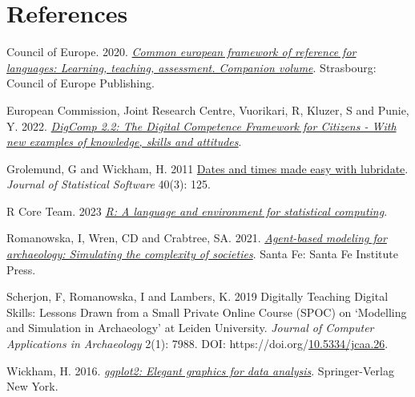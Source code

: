 \documentclass[
]{article}
\newlength{\cslhangindent}
\newlength{\cslentryspacingunit} %
\newenvironment{CSLReferences}[2] %
 {%
  \setlength{\parindent}{0pt}
  \ifodd #1
  \let\oldpar\par
  \def\par{\hangindent=\cslhangindent\oldpar}
  \fi
  \setlength{\parskip}{#2\cslentryspacingunit}
 }%
 {}
\begin{document}
\hypertarget{references}{%
\section*{References}\label{references}}

\hypertarget{refs}{}
\begin{CSLReferences}{1}{0}
\leavevmode{}%
Council of Europe. 2020. \emph{\href{http://www.coe.int/lang-cefr}{Common european framework of reference for languages: Learning, teaching, assessment. Companion volume}}. Strasbourg: Council of Europe Publishing.

\leavevmode{}%
European Commission, Joint Research Centre, Vuorikari, R, Kluzer, S and Punie, Y. 2022. \emph{\href{https://data.europa.eu/doi/10.2760/115376}{DigComp 2.2: The Digital Competence Framework for Citizens - With new examples of knowledge, skills and attitudes}}.

\leavevmode{}%
Grolemund, G and Wickham, H. 2011 \href{https://www.jstatsoft.org/v40/i03/}{Dates and times made easy with lubridate}. \emph{Journal of Statistical Software} 40(3): 125.

\leavevmode{}%
R Core Team. 2023 \emph{\href{https://www.R-project.org/}{R: A language and environment for statistical computing}}.

\leavevmode{}%
Romanowska, I, Wren, CD and Crabtree, SA. 2021. \emph{\href{https://www.sfipress.org/books/agent-based-modeling-archaeology}{Agent-based modeling for archaeology: Simulating the complexity of societies}}. Santa Fe: Santa Fe Institute Press.

\leavevmode{}%
Scherjon, F, Romanowska, I and Lambers, K. 2019 Digitally Teaching Digital Skills: Lessons Drawn from a Small Private Online Course (SPOC) on {`}Modelling and Simulation in Archaeology{'} at Leiden University. \emph{Journal of Computer Applications in Archaeology} 2(1): 7988. DOI: https://doi.org/\href{https://doi.org/10.5334/jcaa.26}{10.5334/jcaa.26}.

\leavevmode{}%
Wickham, H. 2016. \emph{\href{http://ggplot2.org}{ggplot2: Elegant graphics for data analysis}}. Springer-Verlag New York.


\end{CSLReferences}
\end{document}
